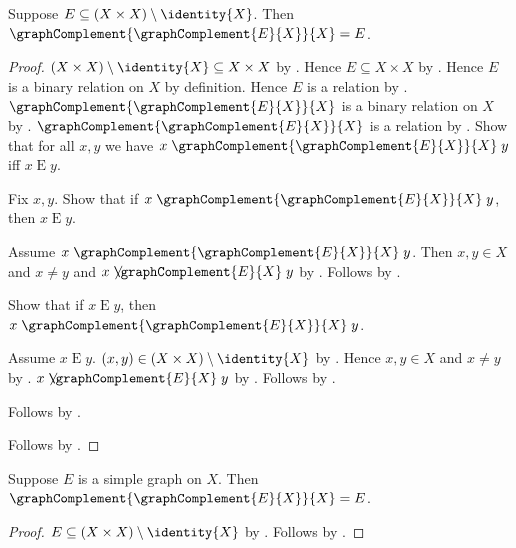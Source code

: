 \begin{proposition}\label{graph_complement_involutive}
    Suppose $E\subseteq (X\times X)\setminus\identity{X}$.
    Then $\graphComplement{\graphComplement{E}{X}}{X}=E$.
\end{proposition}
\begin{proof}
    $(X\times X)\setminus\identity{X}\subseteq X\times X$ by
        .
    Hence $E\subseteq X\times X$ by .
    Hence $E$ is a binary relation on $X$ by definition.
    Hence $E$ is a relation by .
    $\graphComplement{\graphComplement{E}{X}}{X}$ is a binary relation
        on $X$ by .
    $\graphComplement{\graphComplement{E}{X}}{X}$ is a relation by
        .
    Show that for all $x,y$ we have
        $x\mathrel{\graphComplement{\graphComplement{E}{X}}{X}}y$ iff
        $x\mathrel{E}y$.
    \begin{subproof}
        Fix $x,y$.
        Show that if
                $x\mathrel{\graphComplement{\graphComplement{E}{X}}{X}}y$,
            then $x\mathrel{E}y$.
        \begin{subproof}
            Assume
                $x\mathrel{\graphComplement{\graphComplement{E}{X}}{X}}y$.
            Then $x,y\in X$ and $x\neq y$ and
                $x\not\mathrel{\graphComplement{E}{X}}y$ by
                .
            Follows by .
        \end{subproof}
        Show that if $x\mathrel{E}y$, then
            $x\mathrel{\graphComplement{\graphComplement{E}{X}}{X}}y$.
        \begin{subproof}
            Assume $x\mathrel{E}y$.
            $(x,y)\in (X\times X)\setminus\identity{X}$ by
                .
            Hence $x,y\in X$ and $x\neq y$ by
                .
            $x\not\mathrel{\graphComplement{E}{X}}y$ by
                .
            Follows by .
        \end{subproof}
        Follows by \auto.
    \end{subproof}
    Follows by .
\end{proof}

\begin{corollary}\label{simple_graph_complement_involutive}
    Suppose $E$ is a simple graph on $X$.
    Then $\graphComplement{\graphComplement{E}{X}}{X}=E$.
\end{corollary}
\begin{proof}
    $E\subseteq (X\times X)\setminus\identity{X}$ by
        .
    Follows by .
\end{proof}

